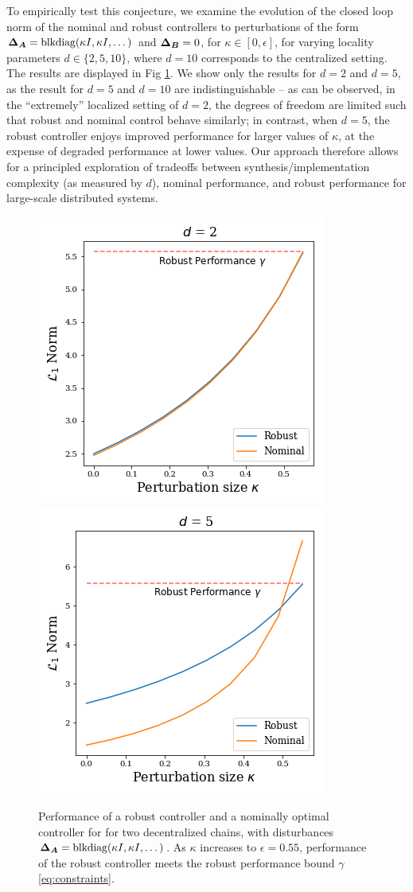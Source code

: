 To empirically test this conjecture, we examine the evolution of the closed loop norm of the nominal and robust controllers to perturbations of the form ${\boldsymbol{\Delta}}_{\boldsymbol{A}} = \mathrm{blkdiag}(\kappa I, \kappa I, \dots)$ and ${\boldsymbol{\Delta}}_{\boldsymbol{B}} = 0$, for $\kappa \in [0,\epsilon]$, for varying locality parameters $d\in\{2,5,10\}$, where $d=10$ corresponds to the centralized setting.  The results are displayed in Fig \ref{fig:kappa}.  We show only the results for $d=2$ and $d=5$, as the result for $d=5$ and $d=10$ are indistinguishable -- as can be observed, in the ``extremely'' localized setting of $d=2$, the degrees of freedom are limited such that robust and nominal control behave similarly; in contrast, when $d=5$, the robust controller enjoys improved performance for larger values of $\kappa$, at the expense of degraded performance at lower values.  Our approach therefore allows for a principled exploration of tradeoffs between synthesis/implementation complexity (as measured by $d$), nominal performance, and robust performance for large-scale distributed systems.

\begin{figure}
\includegraphics[width=.45\columnwidth]{d2.png}~\includegraphics[width=.45\columnwidth]{d5.png}
\caption{Performance of a robust controller and a nominally optimal controller for for two decentralized chains, with disturbances  ${\boldsymbol{\Delta}}_{\boldsymbol{A}} = \mathrm{blkdiag}(\kappa I, \kappa I, \dots)$. As $\kappa$ increases to $\epsilon = 0.55$, performance of the robust controller meets the robust performance bound $\gamma$ \eqref{eq:constraints}.}
\label{fig:kappa}
\end{figure}

